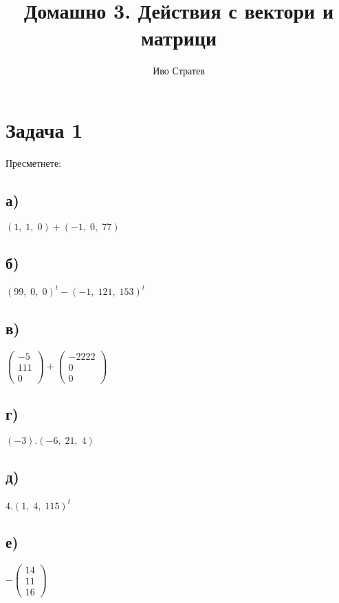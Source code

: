 \documentclass[12pt]{article}
\title{Домашно 3. Действия с вектори и матрици}
\author{Иво Стратев}
\begin{document}
\maketitle

\section*{Задача 1}

Пресметнете:

\subsection*{а)}

$(1, \; 1, \; 0) + (-1, \; 0, \; 77)$

\subsection*{б)}

$(99, \; 0, \; 0)^t - (-1, \; 121, \; 153)^t$

\subsection*{в)}

$\begin{pmatrix} -5 \\ 111 \\ 0 \end{pmatrix} + \begin{pmatrix} -2222 \\ 0 \\ 0 \end{pmatrix}$

\subsection*{г)}
    
$(-3).(-6, \; 21, \; 4)$
    
\subsection*{д)}
    
$4.(1, \; 4, \; 115)^t$
    
\subsection*{е)}
    
$-\begin{pmatrix} 14 \\ 11 \\ 16 \end{pmatrix}$
\end{document}
